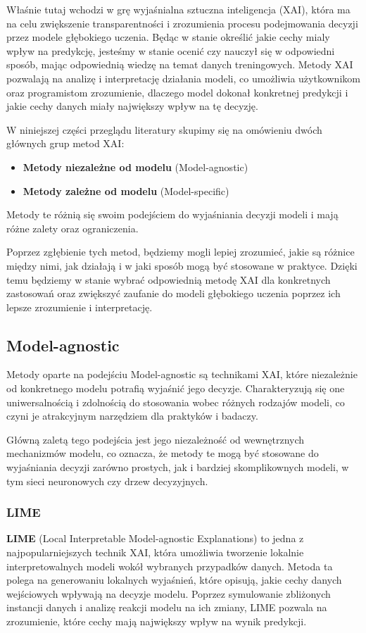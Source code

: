 Właśnie tutaj wchodzi w grę wyjaśnialna sztuczna inteligencja (XAI), która ma na celu zwiększenie transparentności i zrozumienia procesu podejmowania decyzji przez modele głębokiego uczenia.
Będąc w stanie określić jakie cechy mialy wpływ na predykcję, jesteśmy w stanie ocenić czy nauczył się w odpowiedni sposób, mając odpowiednią wiedzę na temat danych treningowych.
Metody XAI pozwalają na analizę i interpretację działania modeli, co umożliwia użytkownikom oraz programistom zrozumienie, dlaczego model dokonał konkretnej predykcji i jakie cechy danych miały największy wpływ na tę decyzję.

W niniejszej części przeglądu literatury skupimy się na omówieniu dwóch głównych grup metod XAI:
\begin{itemize}
	\item \textbf{Metody niezależne od modelu} (Model-agnostic)
	\item \textbf{Metody zależne od modelu} (Model-specific)
\end{itemize}
Metody te różnią się swoim podejściem do wyjaśniania decyzji modeli i mają różne zalety oraz ograniczenia.

Poprzez zgłębienie tych metod, będziemy mogli lepiej zrozumieć, jakie są różnice między nimi, jak działają i w jaki sposób mogą być stosowane w praktyce.
Dzięki temu będziemy w stanie wybrać odpowiednią metodę XAI dla konkretnych zastosowań oraz zwiększyć zaufanie do modeli głębokiego uczenia poprzez ich lepsze zrozumienie i interpretację.

\subsection*{Model-agnostic}
Metody oparte na podejściu Model-agnostic są technikami XAI, które niezależnie od konkretnego modelu potrafią wyjaśnić jego decyzje.
Charakteryzują się one uniwersalnością i zdolnością do stosowania wobec różnych rodzajów modeli, co czyni je atrakcyjnym narzędziem dla praktyków i badaczy.

Główną zaletą tego podejścia jest jego niezależność od wewnętrznych mechanizmów modelu, co oznacza, że metody te mogą być stosowane do wyjaśniania decyzji zarówno prostych, jak i bardziej skomplikownych modeli, w tym sieci neuronowych czy drzew decyzyjnych.

\subsubsection*{LIME}
\textbf{LIME} (Local Interpretable Model-agnostic Explanations) to jedna z najpopularniejszych technik XAI, która umożliwia tworzenie lokalnie interpretowalnych modeli wokół wybranych przypadków danych.
Metoda ta polega na generowaniu lokalnych wyjaśnień, które opisują, jakie cechy danych wejściowych wpływają na decyzje modelu.
Poprzez symulowanie zbliżonych instancji danych i analizę reakcji modelu na ich zmiany, LIME pozwala na zrozumienie, które cechy mają największy wpływ na wynik predykcji.



